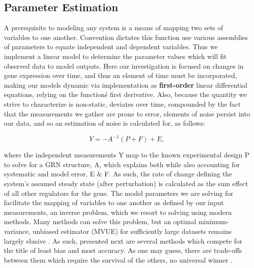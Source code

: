 \subsection{Parameter Estimation}
\label{sec:parest}
A prerequisite to modeling any system is a means of mapping two sets of variables to one another. Convention dictates this function use various assemblies of parameters to equate independent and dependent variables. Thus we implement a linear model to determine the parameter values which will fit observed data to model outputs. Here our investigation is focused on changes in gene expression over time, and thus an element of time must be incorporated, making our models dynamic via implementation as \textbf{first-order} linear differential equations, \ie relying on the function\'s first derivative. Also, because the quantity we strive to characterize is non-static, \ie deviates over time, compounded by the fact that the measurements we gather are prone to error, elements of noise persist into our data, and so an estimation of noise is calculated for, as follows:

\begin{equation}
\label{eq:Linearmap}
  Y = -A^{-1}(P+F)+ E,
\end{equation}

where the independent measurements Y map to the known experimental design P to solve for a GRN structure, A, which explains both while also accounting for systematic and model error, E \& F. As such, the rate of change defining the system's assumed steady state (after perturbation) is calculated as the sum effect of all other regulators for the gene. The model parameters we are solving for facilitate the mapping of variables to one another as defined by our input measurements, \ie an inverse problem, which we resort to solving using modern methods. Many methods can solve this problem, but an optimal minimum-variance, unbiased estimator (MVUE) for sufficiently large datasets remains largely elusive \citep{kay1993fundamentals}. As such, presented next are several methods which compete for the title of least bias and most accuracy. As one may guess, there are trade-offs between them which require the survival of the others, \ie no universal winner \citep{marbach2010revealing,narendra2011comprehensive}.



